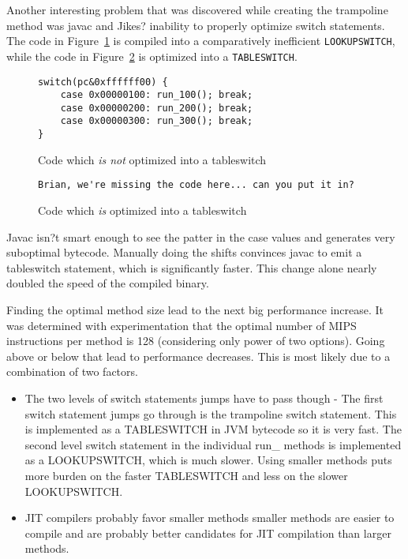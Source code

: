 \documentclass{acmconf}
\begin{document}
Another interesting problem that was discovered while creating the
trampoline method was javac and Jikes? inability to properly optimize
switch statements.  The code in Figure~\ref{lookupswitch} is compiled
into a comparatively inefficient {\tt LOOKUPSWITCH}, while the code in
Figure~\ref{tableswitch} is optimized into a {\tt TABLESWITCH}.

\begin{figure}
{\footnotesize\begin{verbatim}
switch(pc&0xffffff00) {
    case 0x00000100: run_100(); break;
    case 0x00000200: run_200(); break;
    case 0x00000300: run_300(); break;
}
\end{verbatim}}
\caption{\label{lookupswitch} Code which {\it is not} optimized into a tableswitch}
\end{figure}

\begin{figure}
{\footnotesize\begin{verbatim}
Brian, we're missing the code here... can you put it in?
\end{verbatim}}
\caption{\label{tableswitch} Code which {\it is} optimized into a tableswitch}
\end{figure}

Javac isn?t smart enough to see the patter in the case values and
generates very suboptimal bytecode. Manually doing the shifts
convinces javac to emit a tableswitch statement, which is
significantly faster. This change alone nearly doubled the speed of
the compiled binary.

Finding the optimal method size lead to the next big performance
increase.  It was determined with experimentation that the optimal
number of MIPS instructions per method is 128 (considering only power
of two options). Going above or below that lead to performance
decreases. This is most likely due to a combination of two factors.

\begin{itemize}

\item The two levels of switch statements jumps have to pass though -
      The first switch statement jumps go through is the trampoline
      switch statement. This is implemented as a TABLESWITCH in JVM
      bytecode so it is very fast. The second level switch statement
      in the individual run\_ methods is implemented as a
      LOOKUPSWITCH, which is much slower. Using smaller methods puts
      more burden on the faster TABLESWITCH and less on the slower
      LOOKUPSWITCH.

\item JIT compilers probably favor smaller methods smaller methods are
      easier to compile and are probably better candidates for JIT
      compilation than larger methods.

\end{itemize}
\end{document}
